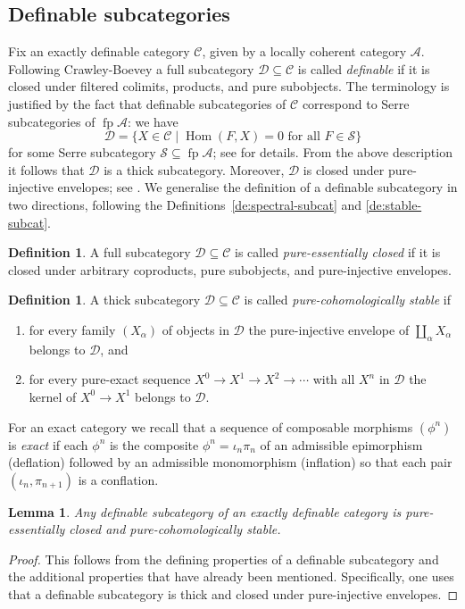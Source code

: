 \documentclass[a4paper]{amsart}
\theoremstyle{plain}
\newtheorem{lem}[thm]{Lemma}
\theoremstyle{definition}
\newtheorem{defn}[thm]{Definition}
\theoremstyle{remark}
\numberwithin{equation}{section}
\newcommand{\fp}{\operatorname{fp}}
\newcommand{\Hom}{\operatorname{Hom}}
\def\A{\mathcal A}
\def\C{\mathcal C}
\def\D{\mathcal D}
\def\calS{\mathcal S}
\def\a{\alpha}
\def\p{\phi}
\begin{document}
\subsection*{Definable subcategories}

Fix an exactly definable category $\C$, given by a locally coherent
category $\A$.  Following Crawley-Boevey \cite{CB1998} a full
subcategory $\D\subseteq\C$ is called \emph{definable} if it is closed
under filtered colimits, products, and pure subobjects. The
terminology is justified by the fact that definable subcategories of
$\C$ correspond to Serre subcategories of $\fp\A$: we have
\[\D=\{X\in\C\mid\Hom(F,X)=0\text{ for all }F\in\calS\}\] for some Serre
subcategory $\calS\subseteq\fp\A$; see \cite[12.2]{Kr2022} for
details.  From the above description it follows that $\D$ is a thick
subcategory. Moreover, $\D$ is closed under pure-injective envelopes;
see \cite[Proposition~12.2.8]{Kr2022}. We generalise the definition of
a definable subcategory in two directions, following the
Definitions~\ref{de:spectral-subcat} and \ref{de:stable-subcat}.

\begin{defn}
  A full subcategory $\D\subseteq\C$ is called \emph{pure-essentially closed} if
  it is closed under arbitrary coproducts, pure subobjects, and  pure-injective
  envelopes.
\end{defn}

\begin{defn}
  A thick subcategory $\D\subseteq\C$ is called \emph{pure-cohomologically stable} if
  \begin{enumerate}
\item for every family $(X_\a)$ of objects in $\D$ the pure-injective
  envelope of  $\coprod_\a X_\a$ belongs to $\D$, and
\item for every pure-exact sequence $X^0\to X^1\to X^2\to\cdots$ with all
  $X^n$ in $\D$ the kernel of $X^0\to X^1$ belongs to $\D$.
\end{enumerate}
\end{defn}

For an exact category we recall that a sequence of composable morphisms
$(\p^n)$  is \emph{exact} if each $\p^n$ is the composite
$\p^n=\iota_n\pi_n$ of an admissible epimorphism (deflation) followed
by an admissible monomorphism (inflation) so that each pair
$(\iota_n,\pi_{n+1})$ is a conflation.

\begin{lem}
  Any definable subcategory of an exactly definable category is
  pure-essentially closed and pure-cohomologically stable.
\end{lem}
\begin{proof}
  This follows from the defining properties of a definable subcategory
  and the additional properties that have already been
  mentioned. Specifically, one uses that a definable subcategory is
  thick and closed under pure-injective envelopes.
\end{proof}
\end{document}
